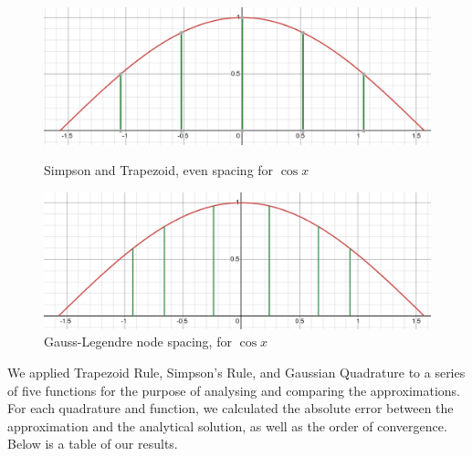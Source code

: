 \documentclass[12pt]{article}
\begin{document}
% 


% 


% 
% 
\begin{figure}[htbp]
	\begin{minipage}[b]{0.45\textwidth}
		\centering
		\includegraphics[width=\textwidth]{../images/Evenly_spaced.png} %
		\caption{Simpson and Trapezoid, even spacing for $\cos x$}
	\end{minipage}
	\hfill
	\begin{minipage}[b]{0.45\textwidth}
		\centering
		\includegraphics[width=\textwidth]{../images/GuassianQuad.png} %
		\caption{Gauss-Legendre node spacing, for $\cos x$}
	\end{minipage}
\end{figure}

We applied Trapezoid Rule, Simpson's Rule, and Gaussian Quadrature to a series of five functions for the purpose of
analysing and comparing the approximations. For each quadrature and function, we calculated the absolute error between
the approximation and the analytical solution, as well as the order of convergence. Below is a table of our results.
\end{document}

